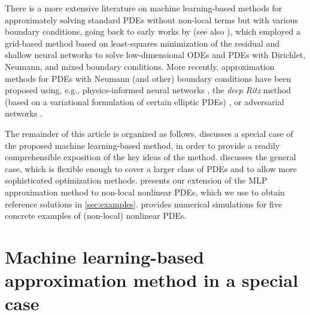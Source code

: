 There is a more extensive literature on machine learning-based methods for approximately solving standard PDEs without non-local terms but with various boundary conditions, going back to early works by \cite{lagaris1998artificial,lagaris2000neural} (see also \cite{mcfall2009artificial}), which employed a grid-based method based on least-squares minimization of the residual and shallow neural networks to solve low-dimensional ODEs and PDEs with Dirichlet, Neumann, and mixed boundary conditions. More recently, approximation methods for PDEs with Neumann (and other) boundary conditions have been proposed using, e.g., physics-informed neural networks \citep{lu2021deepxde,sukumar2022exact,WangPerdikaris2020}, the \emph{deep Ritz} method (based on a variational formulation of certain elliptic PDEs) \citep{e2018deep,liao2021deep,chen2020comparison}, or adversarial networks \citep{zang2020weak}.

The remainder of this article is organized as follows.   discusses a special case of the proposed machine learning-based method, in order to provide a readily comprehensible exposition of the key ideas of the method.  discusses the general case, which is flexible enough to cover a larger class of PDEs and to allow more sophisticated optimization methods.  presents our extension of the MLP approximation method to non-local nonlinear PDEs, which we use to obtain reference solutions in \cref{sec:examples}.  provides numerical simulations for five concrete examples of (non-local) nonlinear PDEs.



\section{Machine learning-based approximation method in a special case}
\label{sec:derivation_spec}


